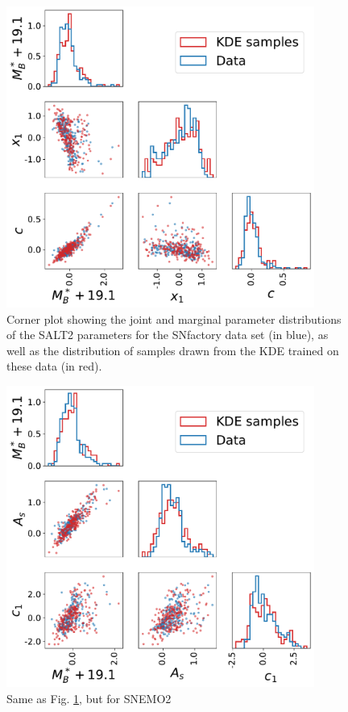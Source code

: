 \begin{figure}
    \centering
\includegraphics[width=0.9\textwidth]{figures/snemo_kde/salt2_corner.pdf}
    \caption{Corner plot showing the joint and marginal parameter distributions of the SALT2 parameters for the SNfactory data set (in blue), as well as the distribution of samples drawn from the KDE trained on these data (in red).}
    \label{fig:salt2_sample}
\end{figure}

\begin{figure}
    \centering
\includegraphics[width=0.9\textwidth]{figures/snemo_kde/snemo2_corner.pdf}
    \caption{Same as Fig. \ref{fig:salt2_sample}, but for SNEMO2}
    \label{fig:snemo2_sample}
\end{figure}

